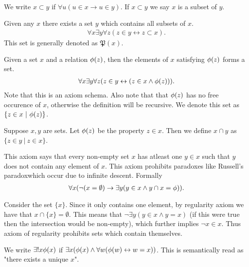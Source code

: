 \begin{definition}
  We write $x\subset y$ if $\forall u (u \in x \to u\in y)$. If $x\subset y$ we say $x$ is a subset of $y$.
\end{definition}
\begin{axiom}
  Given any $x$ there exists a set $y$ which contains all subsets of $x$.
  \begin{align*}
    \forall x \exists y \forall z(z \in y \leftrightarrow z \subset x).
  \end{align*}
  This set is generally denoted as $ \mathfrak{P}(x)$.
\end{axiom}
\begin{axiom}
  Given a set $x$ and a relation $\phi(z)$, then the elements of $x$ satisfying $\phi(z)$ forms a set.
  \begin{align*}
    \forall x \exists y \forall z (z\in y \leftrightarrow (z\in x \land \phi(z))).
  \end{align*}
  Note that this is an axiom schema. Also note that that $\phi(z)$ has no free occurence of $x$, otherwise the definition will be recursive. We denote this set as $\{z\in x\ |\ \phi(z)\}$.
\end{axiom}
\begin{definition}
  Suppose $x,y$ are sets. Let $\phi(z)$ be the property $z\in x$. Then we define $x\cap y$ as $\{z\in y\ |\ z\in x\}$.
\end{definition}
\begin{axiom}
  This axiom says that every non-empty set $x$ has atleast one $y\in x$ such that $y$ does not contain any element of $x$. This axiom prohibits paradoxes like Russell's paradoxwhich occur due to infinite descent. Formally
  \begin{align*}
    \forall x (\lnot (x = \emptyset) \to \exists y(y\in x \land y\cap x = \phi)).
  \end{align*}
\end{axiom}
\begin{remark}
  Consider the set $\{x\}$. Since it only contains one element, by regularity axiom we have that $x\cap \{x\} = \emptyset$. This means that $\lnot \exists y(y \in x \land y=x)$ (if this were true then the intersection would be non-empty), which further implies $\lnot x\in x$. Thus axiom of regularity prohibits sets which contain themselves. 
\end{remark}
\begin{definition}
  We write $\exists ! x \phi(x)$ if $\exists x(\phi(x) \land \forall w(\phi(w) \leftrightarrow w=x))$. This is semantically read as "there exists a unique $x$".
\end{definition}
